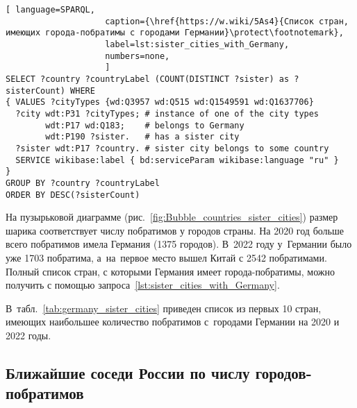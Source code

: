 \begin{lstlisting}[ language=SPARQL, 
                    caption={\href{https://w.wiki/5As4}{Список стран, имеющих города-побратимы с городами Германии}\protect\footnotemark},
                    label=lst:sister_cities_with_Germany,
                    numbers=none,
                    ]
SELECT ?country ?countryLabel (COUNT(DISTINCT ?sister) as ?sisterCount) WHERE
{ VALUES ?cityTypes {wd:Q3957 wd:Q515 wd:Q1549591 wd:Q1637706}
  ?city wdt:P31 ?cityTypes; # instance of one of the city types
        wdt:P17 wd:Q183;    # belongs to Germany
        wdt:P190 ?sister.   # has a sister city
  ?sister wdt:P17 ?country. # sister city belongs to some country
  SERVICE wikibase:label { bd:serviceParam wikibase:language "ru" }
}
GROUP BY ?country ?countryLabel
ORDER BY DESC(?sisterCount)\end{lstlisting}%


На пузырьковой диаграмме (рис.~\ref{fig:Bubble_countries_sister_cities}) 
размер шарика соответствует числу побратимов у городов страны. 
На 2020 год больше всего побратимов имела Германия (\num{1375} городов). 
В~2022 году у~Германии было уже 1703 побратима, 
а~на~первое место вышел Китай с 2542 побратимами. 
Полный список стран, с которыми Германия имеет города-побратимы, 
можно получить с помощью запроса~\ref{lst:sister_cities_with_Germany}.

В~табл.~\ref{tab:germany_sister_cities} приведен список из первых 10 стран, 
имеющих наибольшее количество побратимов с~городами Германии на 2020 и 2022 годы. 




\subsection{Ближайшие соседи России по числу городов-побратимов}

